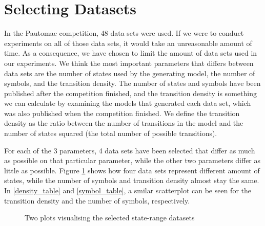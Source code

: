 \section{Selecting Datasets}\label{sec:datasets}
In the Pautomac competition, 48 data sets were used. If we were to conduct experiments on all of those data sets, it would take an unreasonable amount of time.
As a consequence, we have chosen to limit the amount of data sets used in our experiments.
We think the most important parameters that differs between data sets are the number of states used by the generating model, the number of symbols, and the transition density. The number of states and symbols have been published after the competition finished, and the transition density is something we can calculate by examining the models that generated each data set, which was also published when the competition finished.
We define the transition density as the ratio between the number of transitions in the model and the number of states squared (the total number of possible transitions). 

For each of the 3 parameters, 4 data sets have been selected that differ as much as possible on that particular parameter, while the other two parameters differ as little as possible.
Figure \ref{fig:statesetplot} shows how four data sets represent different amount of states, while the number of symbols and transition density almost stay the same. In \ref{density_table} and \ref{symbol_table}, a smilar scatterplot can be seen for the transition density and the number of symbols, respectively.

\begin{figure}
	\centering
	\begin{subfigure}[b]{0.5\textwidth}
        \end{subfigure}%
		\begin{subfigure}[b]{0.5\textwidth}
	\end{subfigure}
  	\caption{Two plots visualising the selected state-range datasets}\label{fig:statesetplot}
\end{figure}

